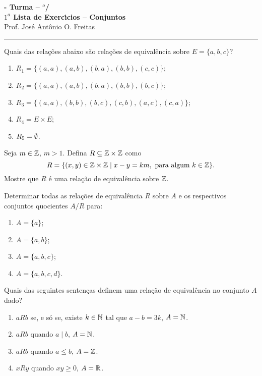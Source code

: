 \documentclass[12pt]{exam}
\begin{document}
\begin{center}
{\Large\bf \disciplina - Turma \turma -- \semestre$^{o}$/\ano} \\ \vspace{9pt} {\large\bf
  $1^{\underline{a}}$ Lista de Exerc{\'\i}cios -- Conjuntos}\\ \vspace{9pt} Prof. Jos{\'e} Ant{\^o}nio O. Freitas
\end{center}
\hrule

\vspace{.6cm}

\questao Quais das rela{\c c}{\~o}es abaixo s{\~a}o rela{\c c}{\~o}es de equival{\^e}ncia sobre $E = \{a,b,c\}$?
\begin{enumerate}[label={\alph*})]
\item $R_1 = \{(a,a),(a,b),(b,a),(b,b),(c,c)\}$;
\item $R_2 = \{(a,a),(a,b),(b,a),(b,b),(b,c)\}$;
\item $R_3 = \{(a,a),(b,b),(b,c),(c,b),(a,c),(c,a)\}$;
\item $R_4 = E \times E$;
\item $R_5 = \emptyset$.
\end{enumerate}

\vspace{.3cm}

\questao Seja $m \in \mathbb{Z}$, $m > 1$. Defina $R \subseteq \mathbb{Z}\times\mathbb{Z}$ como
\[
  R = \{(x,y) \in \mathbb{Z}\times\mathbb{Z} \mid x - y = km, \mbox{ para algum } k \in \mathbb{Z}\}.
\]
Mostre que $R$ \'e uma rela\c{c}\~ao de equival\^encia sobre $\mathbb{Z}$.

\vspace{.3cm}

\questao Determinar todas as rela{\c c}{\~o}es de equival{\^e}ncia
$R$ sobre $A$ e os respectivos conjuntos quocientes $A/R$ para:
\begin{enumerate}[label={\alph*})]
\item $A=\{a\}$;
\item $A=\{a,b\}$;
\item $A=\{a,b,c\}$;
\item $A=\{a,b,c,d\}$.
\end{enumerate}

\vspace{.3cm}

\questao Quais das seguintes senten{\c c}as definem uma rela{\c c}{\~a}o de equival{\^e}ncia no conjunto $A$ dado?
\begin{enumerate}[label={\alph*})]
\item $aRb$ se, e s{\'o} se, existe $k \in \mathbb{N}$ tal que $a - b = 3k$, $A = \mathbb{N}$.
\item $aRb$ quando $a \mid b$, $A = \mathbb{N}$.
\item $aRb$ quando $a \le b$, $A = \mathbb{Z}$.
\item $xRy$ quando $xy \ge 0$, $ A = \mathbb{R}$.
\end{enumerate}
\end{document}
